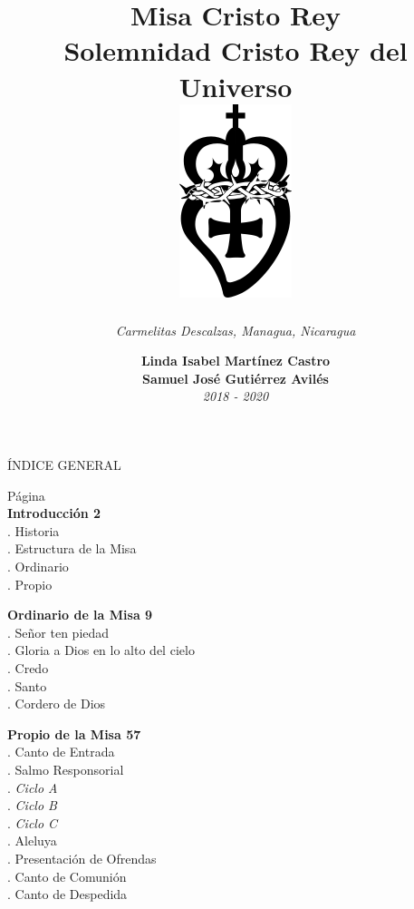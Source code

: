 \documentclass[12pt, letterpaper]{report}
\title{
  \textbf{ \Huge Misa Cristo Rey  } \\
  { \LARGE Solemnidad Cristo Rey del Universo } \\
  \vspace{2em}
  \includegraphics{logo}
}
\author{ \textit{ \large Carmelitas Descalzas, Managua, Nicaragua } }
\date{ \Large \textbf{Linda Isabel Mart\'inez Castro \\ Samuel Jos\'e Guti\'errez Avil\'es} \\ \small \textit{2018 - 2020} }
\begin{document}
    \maketitle

    {\large ÍNDICE GENERAL}

    {\small \hfill{Página}}\\
    \textbf{Introducción \hfill{2}}\\
    .\hspace{1cm} Historia \\
    .\hspace{1cm} Estructura de la Misa \\
    .\hspace{1cm} Ordinario \\
    .\hspace{1cm} Propio 

    \noindent
    \textbf{Ordinario de la Misa \hfill{9}}\\
    .\hspace{1cm} Señor ten piedad \\
    .\hspace{1cm} Gloria a Dios en lo alto del cielo \\
    .\hspace{1cm} Credo \\
    .\hspace{1cm} Santo \\
    .\hspace{1cm} Cordero de Dios 

    \noindent
    \textbf{Propio de la Misa \hfill{57}}\\
    .\hspace{1cm} Canto de Entrada \\
    .\hspace{1cm} Salmo Responsorial \\
    .\hspace{2cm} \textit{Ciclo A} \\
    .\hspace{2cm} \textit{Ciclo B} \\
    .\hspace{2cm} \textit{Ciclo C} \\
    .\hspace{1cm} Aleluya \\
    .\hspace{1cm} Presentación de Ofrendas \\
    .\hspace{1cm} Canto de Comunión \\
    .\hspace{1cm} Canto de Despedida 
    \clearpage
\end{document}
